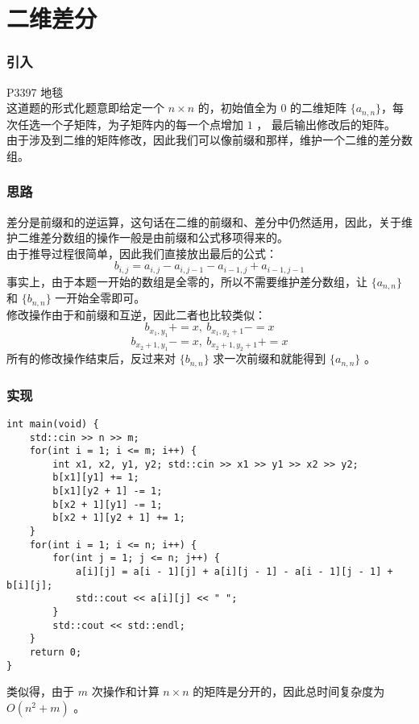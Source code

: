 \documentclass{beamer}
\begin{document}
\section{二维差分}
\begin{frame}
\frametitle{引入}
P3397 地毯 	\\ 
这道题的形式化题意即给定一个 $n \times n$ 的，初始值全为 $0$ 的二维矩阵 $\{a_{n, n}\}$，每次任选一个子矩阵，为子矩阵内的每一个点增加 $1$ ， 最后输出修改后的矩阵。 \\ 
由于涉及到二维的矩阵修改，因此我们可以像前缀和那样，维护一个二维的差分数组。 \\
\end{frame}
\begin{frame}
\frametitle{思路}
差分是前缀和的逆运算，这句话在二维的前缀和、差分中仍然适用，因此，关于维护二维差分数组的操作一般是由前缀和公式移项得来的。\\ 
由于推导过程很简单，因此我们直接放出最后的公式：
$$b_{i, j} = a_{i, j} - a_{i, j - 1} - a_{i - 1, j} + a_{i - 1, j - 1}$$
事实上，由于本题一开始的数组是全零的，所以不需要维护差分数组，让 $\{a_{n, n}\}$ 和 $\{b_{n, n}\}$ 一开始全零即可。 \\
修改操作由于和前缀和互逆，因此二者也比较类似：
$$b_{x_1, y_1} += x, \ b_{x_1, y_2 + 1} -= x$$  
$$b_{x_2 + 1, y_1} -= x,\  b_{x_2 + 1, y_2 + 1} += x$$
所有的修改操作结束后，反过来对 $\{b_{n, n}\}$ 求一次前缀和就能得到 $\{a_{n, n}\}$ 。
\end{frame}
\begin{frame}[fragile]
\frametitle{实现}
\begin{onlyenv}
\begin{verbatim}
int main(void) {
    std::cin >> n >> m;
    for(int i = 1; i <= m; i++) {
        int x1, x2, y1, y2; std::cin >> x1 >> y1 >> x2 >> y2;
        b[x1][y1] += 1;
        b[x1][y2 + 1] -= 1;
        b[x2 + 1][y1] -= 1;
        b[x2 + 1][y2 + 1] += 1;
    }
    for(int i = 1; i <= n; i++) {
        for(int j = 1; j <= n; j++) {
            a[i][j] = a[i - 1][j] + a[i][j - 1] - a[i - 1][j - 1] + b[i][j];
            std::cout << a[i][j] << " ";
        }
        std::cout << std::endl;
    }
    return 0;
}
\end{verbatim}
\end{onlyenv}
类似得，由于 $m$ 次操作和计算 $n \times n$ 的矩阵是分开的，因此总时间复杂度为 $O(n^2 + m)$ 。
\end{frame}
\end{document}
